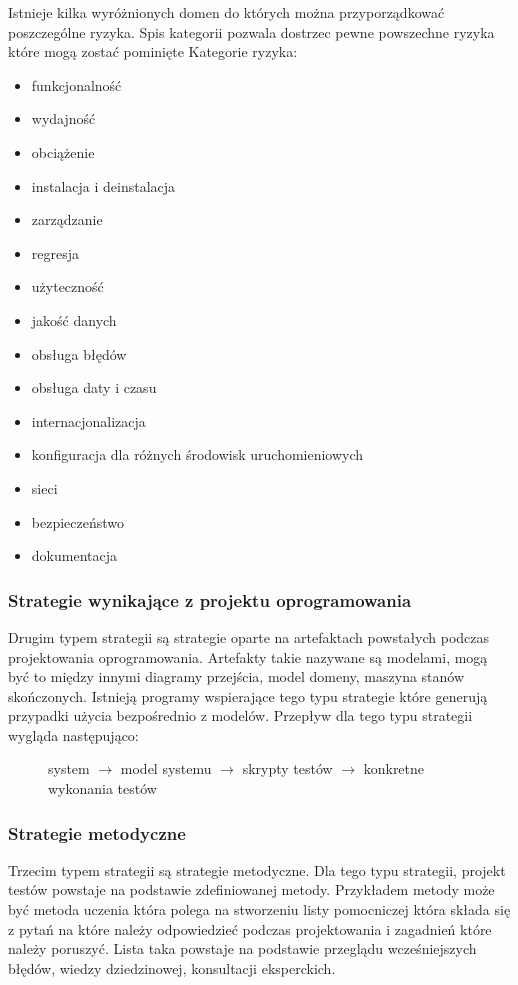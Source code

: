 Istnieje kilka wyróżnionych domen do których można przyporządkować poszczególne ryzyka. Spis kategorii pozwala dostrzec pewne powszechne ryzyka które mogą zostać pominięte
Kategorie ryzyka:
\begin{itemize}
  \item funkcjonalność
  \item wydajność
  \item obciążenie
  \item instalacja i deinstalacja
  \item zarządzanie
  \item regresja
  \item użyteczność
  \item jakość danych
  \item obsługa błędów
  \item obsługa daty i czasu
  \item internacjonalizacja
  \item konfiguracja dla różnych środowisk uruchomieniowych
  \item sieci
  \item bezpieczeństwo
  \item dokumentacja
\end{itemize}

\subsubsection{Strategie wynikające z projektu oprogramowania}
Drugim typem strategii są strategie oparte na artefaktach powstałych podczas projektowania oprogramowania. Artefakty takie nazywane są modelami, mogą być to między innymi diagramy przejścia, model domeny, maszyna stanów skończonych. Istnieją programy wspierające tego typu strategie które generują przypadki użycia bezpośrednio z modelów. Przepływ dla tego typu strategii wygląda następująco: 
\begin{figure}[h!]
  \begin{center}
   system $\rightarrow$  model systemu $\rightarrow$ skrypty testów  $\rightarrow$  konkretne wykonania testów 
  \end{center}
\end{figure}
     
  
\subsubsection{Strategie metodyczne}
Trzecim typem strategii są strategie metodyczne. Dla tego typu strategii, projekt testów powstaje na podstawie zdefiniowanej metody. Przykładem metody może być metoda uczenia która polega na stworzeniu listy pomocniczej która składa się z pytań na które należy odpowiedzieć podczas projektowania i zagadnień które należy poruszyć. Lista taka powstaje na podstawie przeglądu wcześniejszych błędów, wiedzy dziedzinowej, konsultacji eksperckich. 

